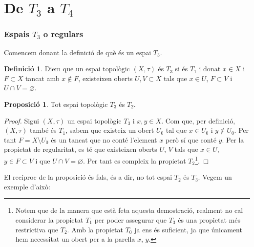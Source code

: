 \documentclass[10pt,a4paper]{article}
\theoremstyle{definition}
\newtheorem{definition}[theorem]{Definició}
\newtheorem{prop}[theorem]{Proposició}
\begin{document}
\section{De \texorpdfstring{$T_3$}{T3} a \texorpdfstring{$T_4$}{T4}}
\subsubsection*{Espais $T_3$ o regulars}
Comencem donant la definició de què és un espai $T_3$.
\begin{definition}
      Diem que un espai topològic $(X,\tau)$ és $T_3$ si és $T_1$ i donat $x\in X$ i $F\subset X$ tancat amb $x\notin F$, existeixen oberts $U,V\subset X$ tals que $x\in U$, $F\subset V$ i $U\cap V=\varnothing$.
\end{definition}
\begin{prop}
      Tot espai topològic $T_3$ és $T_2$.
\end{prop}
\begin{proof}
      Sigui $(X,\tau)$ un espai topològic $T_3$ i $x, y\in X$. Com que, per definició, $(X,\tau)$ també és $T_1$, sabem que existeix un obert $U_0$ tal que $x\in U_0$ i $y\notin U_0$. Per tant $F=X\setminus U_0$ és un tancat que no conté l'element $x$ però sí que conté $y$. Per la propietat de regularitat, es té que existeixen oberts $U$, $V$ tals que $x\in U$, $y\in F\subset V$ i que $U\cap V=\varnothing$. Per tant es compleix la propietat $T_2$\footnote{Notem que de la manera que està feta aquesta demostració, realment no cal considerar la propietat $T_1$ per poder assegurar que $T_3$ és una propietat més restrictiva que $T_2$. Amb la propietat $T_0$ ja ens és suficient, ja que únicament hem necessitat un obert per a la parella $x$, $y$.}.
\end{proof}

El recíproc de la proposició és fals, és a dir, no tot espai $T_2$ és $T_3$. Vegem un exemple d'això:
\end{document}
